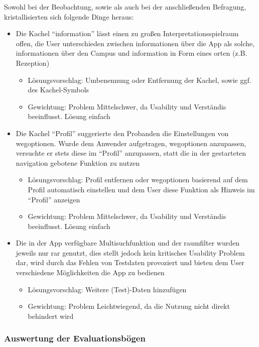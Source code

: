 Sowohl bei der Beobachtung, sowie als auch bei der anschließenden Befragung, kristallisierten sich folgende Dinge heraus:
\begin{itemize}
    \item Die Kachel “\gls{information}” lässt einen zu großen Interpretationsspielraum offen, die User unterschieden zwischen \gls{information}en über die App als solche, \gls{information}en über den Campus und \gls{information} in Form eines \gls{ort}en (z.B. Rezeption)
    \begin{itemize}
        \item Lösungsvorschlag: Umbenennung oder Entfernung der Kachel, sowie ggf. des Kachel-Symbols
        \item Gewichtung: Problem Mittelschwer, da Usability und Verständis beeinflusst. Lösung einfach
    \end{itemize}
    \item Die Kachel “Profil” suggerierte den Probanden die Einstellungen von \gls{weg}optionen. Wurde dem Anwender aufgetragen, \gls{weg}optionen anzupassen, versuchte er stets diese im “Profil” anzupassen, statt die in der gestarteten \gls{navigation} gebotene Funktion zu nutzen
    \begin{itemize}
        \item Lösungsvorschlag: Profil entfernen oder \gls{weg}optionen basierend auf dem Profil automatisch einstellen und dem User diese Funktion als Hinweis im “Profil” anzeigen
        \item Gewichtung: Problem Mittelschwer, da Usability und Verständis beeinflusst. Lösung einfach
    \end{itemize}
    \item Die in der App verfügbare Multisuchfunktion und der \gls{raum}filter wurden jeweils nur rar genutzt, dies stellt jedoch kein kritisches Usability Problem dar, wird durch das Fehlen von Testdaten provoziert und bieten dem User verschiedene Möglichkeiten die App zu bedienen
    \begin{itemize}
        \item Lösungsvorschlag: Weitere (Test)-Daten hinzufügen
        \item Gewichtung: Problem Leichtwiegend, da die Nutzung nicht direkt behindert wird
    \end{itemize}
\end{itemize}

\subsubsection*{Auswertung der Evaluationsbögen}

